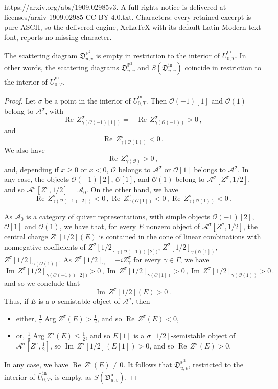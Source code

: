 \documentclass[10pt,a4paper]{amsart}
\newcommand\Arg{\operatorname{Arg}}
\newcommand\Ima{\operatorname{Im}\,}
\newcommand\PP{\mathbb P}
\newcommand\Rea{\operatorname{Re}\,}
\newcommand\cA{\mathcal A}
\newcommand\cO{\mathcal O}
\newcommand\fD{\mathfrak D}
\newcommand\iin{\mathrm{in}}
\begin{document}
https://arxiv.org/abs/1909.02985v3. A full rights notice is delivered at licenses/arxiv-1909.02985-CC-BY-4.0.txt. Characters: every retained excerpt is pure ASCII, so the delivered engine, XeLaTeX with its default Latin Modern text font, reports no missing character.
\begin{lem} \label{lem_coincide_int_T}
The scattering diagram $\fD^{\PP^2}_{u,v}$ is empty in restriction to the interior of 
$\bar{U}^\iin_{0,T}$.
In other words, the scattering diagrams 
$\fD^{\PP^2}_{u,v}$ and 
$S(\fD^\iin_{u,v})$ coincide in restriction to the interior of 
$\bar{U}^\iin_{0,T}$.
\end{lem}

\begin{proof}
Let $\sigma$ be a point in the interior of $\bar{U}^\iin_{0,T}$.
Then $\cO(-1)[1]$ and $\cO(1)$ belong to 
$\cA^\sigma$, with 
\[\Rea Z^\sigma_{\gamma(\cO(-1)[1])}=-\Rea Z^\sigma_{\gamma(\cO(-1))}>0\,,\]
and
\[\Rea Z^\sigma_{\gamma(\cO(1))}<0\,.\]
We also have 
\[ \Rea Z^\sigma_{\gamma(\cO)}>0\,,\]
and, depending if $x \geqslant 0$ or 
$x<0$, $\cO$ belongs to $\cA^\sigma$ or 
$\cO[1]$ belongs to 
$\cA^\sigma$.
In any case, the objects $\cO(-1)[2]$, $\cO[1]$, and $\cO(1)$ belong to $\cA^\sigma[Z^\sigma,1/2]$, and so 
$\cA^\sigma[Z^\sigma, 1/2]=\cA_0$.
On the other hand, we have 
\[ \Rea Z_{\gamma(\cO(-1)[2])}^\sigma 
<0\,, \Rea Z_{\gamma(\cO[1])}^\sigma<0 \,,
\Rea Z_{\gamma(\cO(1))}^\sigma <0\,.\]





As $\cA_0$ is a category of quiver representations, with simple objects 
$\cO(-1)[2]$, $\cO[1]$ and $\cO(1)$, we have that, for every $E$ nonzero object of 
$\cA^\sigma[Z^\sigma,1/2]$, the central charge
$Z^\sigma[1/2](E)$ is contained in the cone of linear combinations with 
nonnegative coefficients of 
$Z^\sigma[1/2]_{\gamma(\cO(-1))[2])}$,
$Z^\sigma[1/2]_{\gamma(\cO[1])}
$, 
$Z^\sigma[1/2]_{\gamma(\cO(1))}$.
As $Z^\sigma[1/2]_\gamma=-i Z^\sigma_\gamma$ for every $\gamma \in \Gamma$, 
we have  
\[ \Ima Z^\sigma[1/2]_{\gamma(\cO(-1))[2])}>0\,,
\Ima Z^\sigma[1/2]_{\gamma(\cO[1])}>0
\,,
\Ima Z^\sigma[1/2]_{\gamma(\cO(1))}>0\,.\]
and so
we conclude that 
\[\Ima Z^\sigma[1/2](E)>0\,.\]
Thus, if $E$ is a $\sigma$-semistable object of $\cA^\sigma$, then 
\begin{itemize}
\item[(i)] either, $\frac{1}{\pi} \Arg Z^\sigma(E)>\frac{1}{2}$, and so 
$\Rea Z^\sigma(E)<0$,
\item[(ii)] or, $\frac{1}{\pi} \Arg Z^{\sigma}(E) 
\leqslant \frac{1}{2}$, and so $E[1]$
is a $\sigma[1/2]$-semistable object 
of $\cA^\sigma[Z^\sigma, \frac{1}{2}]$, so
$\Ima Z^\sigma[1/2](E[1])>0$, and so
$\Rea Z^\sigma(E)>0$.
\end{itemize}
In any case, we have $\Rea Z^\sigma(E) \neq 0$. It follows that $\fD^{\PP^2}_{u,v}$, restricted to the interior of 
$\bar{U}_{0,T}^{\iin}$, is empty, as 
$S(\fD^\iin_{u,v})$.


\end{proof}
\end{document}

